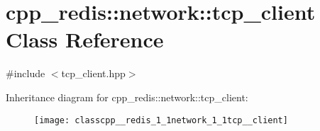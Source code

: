 \hypertarget{classcpp__redis_1_1network_1_1tcp__client}{}\section{cpp\+\_\+redis\+:\+:network\+:\+:tcp\+\_\+client Class Reference}
\label{classcpp__redis_1_1network_1_1tcp__client}


{\ttfamily \#include $<$tcp\+\_\+client.\+hpp$>$}

Inheritance diagram for cpp\+\_\+redis\+:\+:network\+:\+:tcp\+\_\+client\+:\begin{figure}[H]
\begin{center}
\leavevmode
\texttt{[image: classcpp\_\_redis\_1\_1network\_1\_1tcp\_\_client]}
\end{center}
\end{figure}

